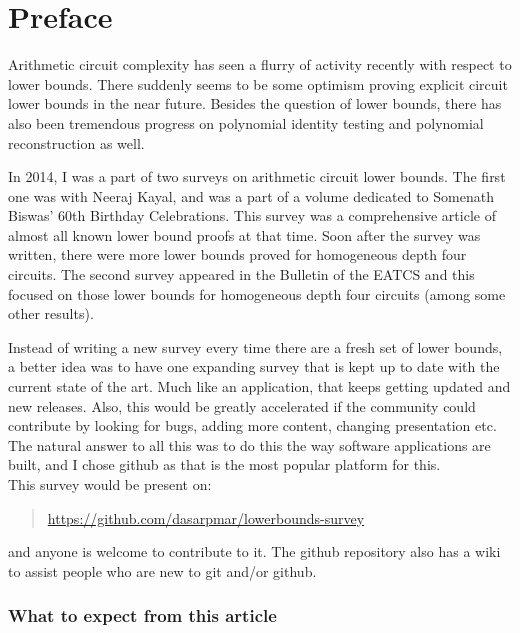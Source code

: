 \chapter*{Preface}

Arithmetic circuit complexity has seen a flurry of activity recently with respect to lower bounds. 
There suddenly seems to be some optimism proving explicit circuit lower bounds in the near future. 
Besides the question of lower bounds, there has also been tremendous progress on polynomial identity testing and polynomial reconstruction as well. 

In 2014, I was a part of two surveys on arithmetic circuit lower bounds. 
The first one \cite{KayalRP} was with Neeraj Kayal, and was a  part of a volume dedicated to Somenath Biswas' 60th Birthday Celebrations. 
This survey was a comprehensive article of almost all known lower bound proofs at that time. 
Soon after the survey was written, there were more lower bounds proved for homogeneous depth four circuits. 
The second survey \cite{rp:beatcs} appeared in the Bulletin of the EATCS and this focused on those lower bounds for homogeneous depth four circuits (among some other results). 

Instead of writing a new survey every time there are a fresh set of lower bounds, a better idea was to have one expanding survey that is kept up to date with the current state of the art. 
Much like an application, that keeps getting updated and new releases. 
Also, this would be greatly accelerated if the community could contribute by looking for bugs, adding more content, changing presentation etc. 
The natural answer to all this was to do this the way software applications are built, and I chose github as that is the most popular platform for this. \\

\noindent 
This survey would be present on:
\begin{quote} 
  \url{https://github.com/dasarpmar/lowerbounds-survey}
\end{quote}
and anyone is welcome to contribute to it. 
The github repository also has a wiki to assist people who are new to git and/or github. \\



\subsection*{What to expect from this article}

